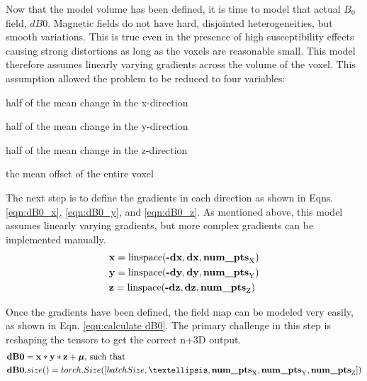\documentclass[AMA,LATO1COL]{WileyNJD-v2}
\begin{document}
Now that the model volume has been defined, it is time to model that actual $B_0$ field, $dB0$. Magnetic fields do not have hard, disjointed heterogeneities, but smooth variations. This is true even in the presence of high susceptibility effects causing strong distortions as long as the voxels are reasonable small. This model therefore assumes linearly varying gradients across the volume of the voxel. This assumption allowed the problem to be reduced to four variables:
\begin{description}[labelindent=2cm]
    \item[$\mathbf{dx}$] half of the mean change in the x-direction
    \item[$\mathbf{dy}$] half of the mean change in the y-direction
    \item[$\mathbf{dz}$] half of the mean change in the z-direction
    \item[$\boldsymbol{\mu\ \ }$] the mean offset of the entire voxel
\end{description}

The next step is to define the gradients in each direction as shown in Eqns. \ref{eqn:dB0_x}, \ref{eqn:dB0_y}, and \ref{eqn:dB0_z}. As mentioned above, this model assumes linearly varying gradients, but more complex gradients can be implemented manually.
\begin{align} 
    &\mathbf{x} = \textnormal{linspace}(\textbf{-dx}, \textbf{dx}, \textbf{num\_pts}_\textnormal{X}) \label{eqn:dB0_x}\\
    &\mathbf{y} = \textnormal{linspace}(\textbf{-dy}, \textbf{dy}, \textbf{num\_pts}_\textnormal{Y}) \label{eqn:dB0_y}\\
    &\mathbf{z} = \textnormal{linspace}(\textbf{-dz}, \textbf{dz}, \textbf{num\_pts}_\textnormal{Z}) \label{eqn:dB0_z}
\end{align}

Once the gradients have been defined, the field map can be modeled very easily, as shown in Eqn. \ref{eqn:calculate dB0}. The primary challenge in this step is reshaping the tensors to get the correct n+3D output.
\begin{align}\label{eqn:calculate dB0}
    &\mathbf{dB0} = \textbf{x}*\textbf{y}*\textbf{z} + \boldsymbol{\mu}\textnormal{, such that}\\ &\mathbf{dB0}.size() = torch.Size([batchSize, …, \textbf{num\_pts}_\textnormal{X}, \textbf{num\_pts}_\textnormal{Y}, \textbf{num\_pts}_\textnormal{Z}])
\end{align}
\end{document}
